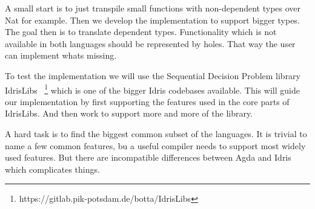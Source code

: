 \documentclass{scrartcl}
\begin{document}
A small start is to just transpile small functions with non-dependent types
over Nat for example. Then we develop the implementation to support bigger
types. The goal then is to translate dependent types.
Functionality which is not available in both languages should be represented by
holes. That way the user can implement whats missing.

To test the implementation we will use the Sequential Decision Problem library IdrisLibs
~\footnote{https://gitlab.pik-potsdam.de/botta/IdrisLibs} which is one of the
bigger Idris codebases available. This will guide our implementation by first
supporting the features used in the core parts of IdrisLibs. And then work to
support more and more of the library.

A hard task is to find the biggest common subset of the languages. It is trivial
to name a few common features, bu a useful compiler needs to support most
widely used features. But there are incompatible differences between Agda and
Idris which complicates things.











\end{document}
